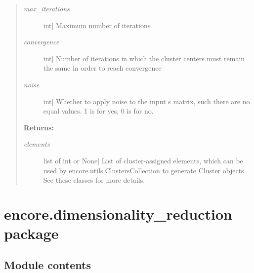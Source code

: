\documentclass[letterpaper,10pt,english]{sphinxmanual}
\begin{document}
\begin{fulllineitems}
\begin{quote}
\begin{fulllineitems}
\begin{description}
\item[{\emph{max\_iterations}}] \leavevmode{[}int{]}
Maximum number of iterations

\item[{\emph{convergence}}] \leavevmode{[}int{]}
Number of iterations in which the cluster centers must remain the same in order to reach convergence

\item[{\emph{noise}}] \leavevmode{[}int{]}
Whether to apply noise to the input s matrix, such there are no equal values. 1 is for yes, 0 is for no.

\end{description}

\textbf{Returns:}
\begin{description}
\item[{\emph{elements}}] \leavevmode{[}list of int or None{]}
List of cluster-assigned elements, which can be used by encore.utils.ClustersCollection to generate Cluster objects. See these classes for more details.

\end{description}

\end{fulllineitems}

\end{quote}

\end{fulllineitems}



\chapter{encore.dimensionality\_reduction package}
\label{index:encore-dimensionality-reduction-package}

\section{Module contents}
\label{index:module-contents}\label{index:module-encore.dimensionality_reduction}\label{index:module-encore.dimensionality_reduction.stochasticproxembed}
\end{document}
